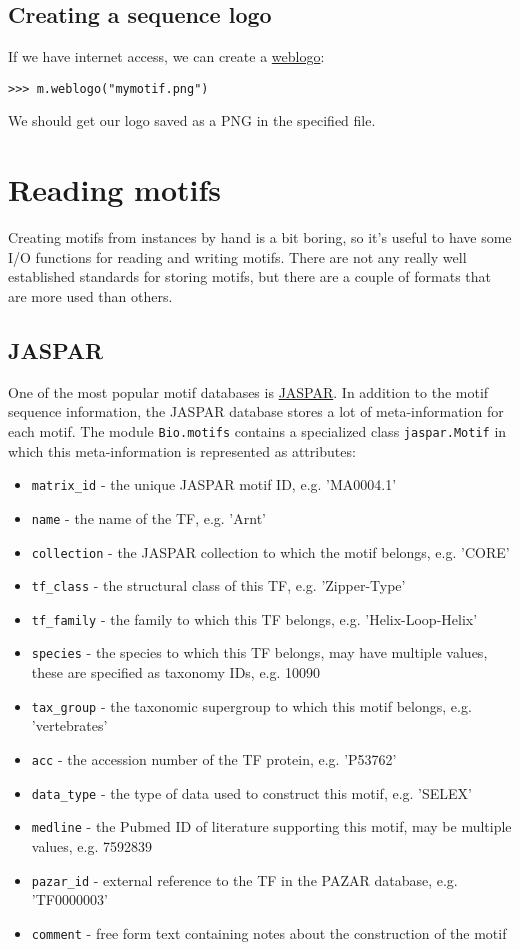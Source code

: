 \subsection{Creating a sequence logo}
If we have internet access, we can create a \href{https://weblogo.berkeley.edu}{weblogo}:
\begin{verbatim}
>>> m.weblogo("mymotif.png")
\end{verbatim}
We should get our logo saved as a PNG in the specified file.

\section{Reading motifs}
\label{sec:io}

Creating motifs from instances by hand is a bit boring, so it's
useful to have some I/O functions for reading and writing
motifs. There are not any really well established standards for storing
motifs, but there are a couple of formats that are more used than
others.

\subsection{JASPAR}
One of the most popular motif databases is \href{http://jaspar.genereg.net}{JASPAR}. In addition to the motif sequence information, the JASPAR database stores a lot of meta-information for each motif. The module \verb+Bio.motifs+ contains a specialized class \verb+jaspar.Motif+ in which this meta-information is represented as attributes:
\begin{itemize}
    \item \verb+matrix_id+ - the unique JASPAR motif ID, e.g. 'MA0004.1'
    \item \verb+name+ - the name of the TF, e.g. 'Arnt'
    \item \verb+collection+ - the JASPAR collection to which the motif belongs, e.g. 'CORE'
    \item \verb+tf_class+ - the structural class of this TF, e.g. 'Zipper-Type'
    \item \verb+tf_family+ - the family to which this TF belongs, e.g. 'Helix-Loop-Helix'
    \item \verb+species+ - the species to which this TF belongs, may have multiple values, these are specified as taxonomy IDs, e.g. 10090
    \item \verb+tax_group+ - the taxonomic supergroup to which this motif belongs, e.g. 'vertebrates'
    \item \verb+acc+ - the accession number of the TF protein, e.g. 'P53762'
    \item \verb+data_type+ - the type of data used to construct this motif, e.g. 'SELEX'
    \item \verb+medline+ - the Pubmed ID of literature supporting this motif, may be multiple values, e.g. 7592839
    \item \verb+pazar_id+ - external reference to the TF in the PAZAR database, e.g. 'TF0000003'
    \item \verb+comment+ - free form text containing notes about the construction of the motif
\end{itemize}

